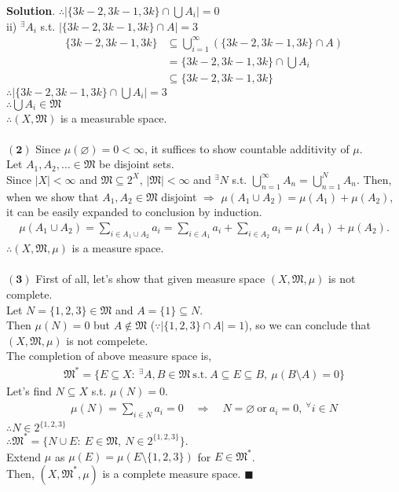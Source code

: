 \documentclass[12pt]{article}
\renewcommand{\v}[1]{\ensuremath{\mathbf{#1}}} %
\renewcommand{\=}[1]{\stackrel{#1}{=}} %
\providecommand{\MM}{\mathfrak{M}}
\providecommand{\seq}{\subseteq}
\theoremstyle{definition}
\newenvironment{s}{%
        \begin{trivlist} \item \textbf{Solution}. }{%
            \hspace*{\fill} $\blacksquare$\end{trivlist}}%
\begin{document}
{\begin{s}
\indent\indent $\therefore\left|\{3k-2,3k-1,3k\}\cap \bigcup A_i\right|=0$\\
\indent\indent ii) ${}^\exists A_i$ s.t. $|\{3k-2,3k-1,3k\}\cap A|=3$
\begin{align*}
\{3k-2,3k-1,3k\}&\subseteq \bigcup_{i=1}^\infty(\{3k-2,3k-1,3k\}\cap A)\\
&=\{3k-2,3k-1,3k\}\cap \bigcup A_i \\
&\subseteq \{3k-2,3k-1,3k\}
\end{align*}
\indent\indent $\therefore\left|\{3k-2,3k-1,3k\}\cap \bigcup A_i\right|=3$\\
\indent $\therefore \bigcup A_i\in\MM$\\
$\therefore (X,\MM)$ is a measurable space.\\ \\
\v{(2)} Since $\mu(\varnothing)=0<\infty$, it suffices to show countable additivity of $\mu$.\\
Let $A_1, A_2, \ldots \in \MM$ be disjoint sets.\\
Since $|X|<\infty$ and $\MM\subseteq 2^X$, $|\MM|<\infty$ and ${}^\exists N$ s.t. $\bigcup_{n=1}^{\infty}A_n = \bigcup_{n=1}^{N}A_n$. Then, when we show that $A_1, A_2\in\MM$ disjoint $\Rightarrow$ $\mu(A_1\cup A_2)=\mu(A_1)+\mu(A_2)$, it can be easily expanded to conclusion by induction.
\begin{align*}
\mu(A_1 \cup A_2) = \sum_{i\in A_1\cup A_2} a_i = \sum_{i\in A_1} a_i + \sum_{i\in A_2} a_i = \mu(A_1) + \mu(A_2).
\end{align*}
$\therefore (X,\MM,\mu)$ is a measure space.\\
\\
\v{(3)} First of all, let's show that given measure space $(X,\MM,\mu)$ is not complete.\\
Let $N = \{1, 2, 3\}\in\MM$ and $A=\{1\}\subseteq N$.\\
Then $\mu(N)=0$ but $A\not\in\MM$ ($\because |\{1,2,3\}\cap A|=1$), so we can conclude that $(X,\MM,\mu)$ is not compelete.\\
The completion of above measure space is,
\begin{align*}
\MM^* =\{E\seq X:\ {}^\exists A, B\in\MM\ \mathrm{s.t.}\ A\seq E \seq B,\ \mu(B\setminus A)=0\}
\end{align*}
Let's find $N\seq X$ s.t. $\mu(N)=0$.
\begin{align*}
\mu(N) = \sum_{i\in N} a_i = 0\quad\Rightarrow\quad N=\varnothing\ \mathrm{or}\ a_i=0,\ {}^\forall i\in N
\end{align*}
$\therefore N\in 2^{\{1,2,3\}}$\\
$\therefore \MM^* = \{N\cup E:\ E\in\MM,\ N\in 2^{\{1,2,3\}}\}$.\\
Extend $\mu$ as $\mu(E)=\mu(E\setminus\{1,2,3\})$ for $E\in\MM^*$.\\
Then, $(X, \MM^*, \mu)$ is a complete measure space.
\end{s}
\end{document}

